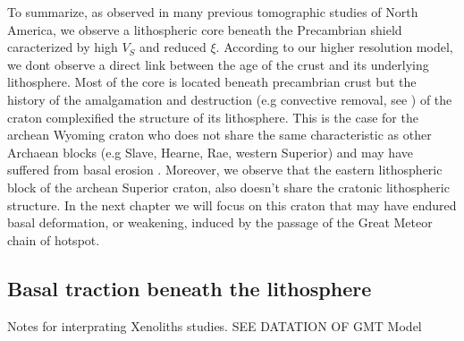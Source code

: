 \documentclass[12pt]{article}
\begin{document}
		To summarize, as observed in many previous tomographic studies of North America, we observe a lithospheric core beneath the Precambrian shield caracterized by high $V_S$ and reduced $\xi$. 
		According to our higher resolution model, we dont observe a direct link between the age of the crust and its underlying lithosphere. Most of the core is located beneath precambrian crust but the history of the amalgamation and destruction (e.g convective removal, see \cite{lee2011building}) of the craton complexified the structure of its lithosphere. 
		This is the case for the archean Wyoming craton who does not share the same characteristic as other Archaean blocks (e.g Slave, Hearne, Rae, western Superior) and may have suffered from basal erosion \citep{s2005archean,lee2011building}. 
		Moreover, we observe that the eastern lithospheric block of the archean Superior craton, also doesn't share the cratonic lithospheric structure. In the next chapter we will focus on this craton that may have endured basal deformation, or weakening, induced by the passage of the Great Meteor chain of hotspot.

	\subsection{Basal traction beneath the lithosphere}

	Notes for interprating Xenoliths studies. SEE DATATION OF GMT Model

	
\end{document}
